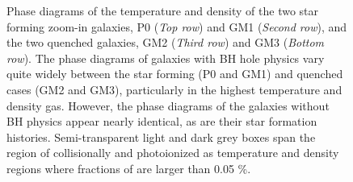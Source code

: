 \documentclass[]{emulateapj}
\begin{document}
\begin{figure}[p!]
\centerline{
}
\caption[]{Phase diagrams of the temperature and density of the two star forming zoom-in galaxies, P0 (\textit{Top row}) and GM1 (\textit{Second row}), and the two quenched galaxies, GM2 (\textit{Third row}) and GM3 (\textit{Bottom row}). The phase diagrams of galaxies with BH hole physics vary quite widely between the star forming (P0 and GM1) and quenched cases (GM2 and GM3), particularly in the highest temperature and density gas. However, the phase diagrams of the galaxies without BH physics appear nearly identical, as are their star formation histories. Semi-transparent light and dark grey boxes span the region of collisionally and photoionized  as temperature and density regions where fractions of  are larger than 0.05 \%.}
\label{phasediagrams}
\end{figure}
\end{document}
